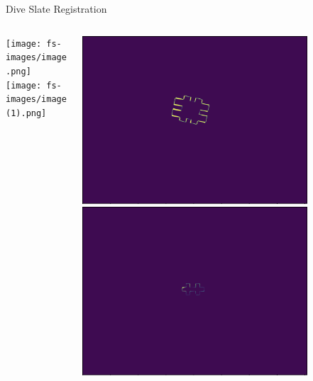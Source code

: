 \begin{frame}{Dive Slate Registration}
    \begin{columns}
        \begin{column}{0.48\textwidth}
            \centering
            \texttt{[image: fs-images/image.png]}
            \texttt{[image: fs-images/image (1).png]}
        \end{column}
        \begin{column}{0.48\textwidth}
            \centering
            \includegraphics[height=0.8\textheight,width=0.8\textwidth,keepaspectratio]{fs-images/image (2).png}
            \includegraphics[height=0.8\textheight,width=0.8\textwidth,keepaspectratio]{fs-images/image (3).png}
        \end{column}
    \end{columns}
\end{frame}

